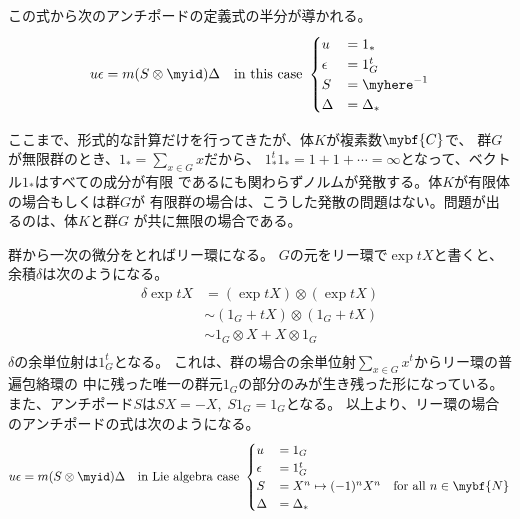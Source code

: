 	この式から次のアンチポードの定義式の半分が導かれる。
	\begin{equation*}\begin{split} %
		u\epsilon = m(S\otimes\myid)\Delta 
		\quad\text{in this case }\begin{cases} %
			u &= 1_* \\
			\epsilon &= 1_G^t \\
			S &= \myhere^{-1} \\
			\Delta &= \Delta_* \\
		\end{cases} %
	\end{split}\end{equation*} %

	ここまで、形式的な計算だけを行ってきたが、体$K$が複素数$\mybf{C}$で、
	群$G$が無限群のとき、$1_*=\sum_{x\in G}x$だから、
	$1_*^t1_*=1+1+\cdots=\infty$となって、ベクトル$1_*$はすべての成分が有限
	であるにも関わらずノルムが発散する。体$K$が有限体の場合もしくは群$G$が
	有限群の場合は、こうした発散の問題はない。問題が出るのは、体$K$と群$G$
	が共に無限の場合である。

	\begin{example}[リー環の場合]\label{eg:リー環の場合} %
		群から一次の微分をとればリー環になる。
		$G$の元をリー環で$\exp tX$と書くと、余積$\delta$は次のようになる。
		\begin{equation*}\begin{split} %
			\delta \exp tX &= (\exp tX)\otimes(\exp tX) \\
			&\sim (1_G+tX)\otimes(1_G+tX) \\
			&\sim 1_G\otimes X + X\otimes 1_G \\
		\end{split}\end{equation*} %
		$\delta$の余単位射は$1_G^t$となる。
		これは、群の場合の余単位射$\sum_{x\in G}x^t$からリー環の普遍包絡環の
		中に残った唯一の群元$1_G$の部分のみが生き残った形になっている。
		また、アンチポード$S$は$SX=-X,\;S1_G=1_G$となる。
		以上より、リー環の場合のアンチポードの式は次のようになる。
		\begin{equation*}\begin{split} %
			u\epsilon = m(S\otimes\myid)\Delta
			\quad\text{in Lie algebra case }\begin{cases} %
				u &= 1_G \\
				\epsilon &= 1_G^t \\
				S &= X^n\mapsto (-1)^nX^n \quad\text{for all }n\in \mybf{N} \\
				\Delta &= \Delta_* \\
			\end{cases} %
		\end{split}\end{equation*} %
	\end{example} %


